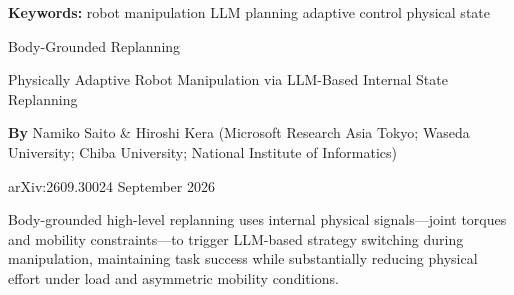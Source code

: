\documentclass[10pt,twocolumn]{article}
\begin{document}
\setlength{\parindent}{0pt}
\setlength{\parskip}{4pt}

{\small\color{keywordgray}\textbf{Keywords:}
  robot manipulation \textbullet{}
  LLM planning \textbullet{}
  adaptive control \textbullet{}
  physical state}\par\vspace{4pt}

{\LARGE\bfseries\raggedright
  Body-Grounded Replanning}\par\vspace{4pt}

{\large\itshape\raggedright
  Physically Adaptive Robot Manipulation via
  LLM-Based Internal State Replanning}\par\vspace{6pt}

{\small\textbf{By} Namiko Saito \& Hiroshi Kera
  (Microsoft Research Asia Tokyo; Waseda University;
  Chiba University; National Institute of Informatics)}\par\vspace{2pt}

{\small\color{keywordgray}arXiv:2609.30024 \textbullet{} September 2026}
\par\vspace{2pt}\noindent{\color{rulered}\rule{\columnwidth}{0.6pt}}\vspace{6pt}

Body-grounded high-level replanning uses internal physical signals---joint
torques and mobility constraints---to trigger LLM-based strategy switching
during manipulation, maintaining task success while substantially reducing
physical effort under load and asymmetric mobility conditions.
\end{document}
